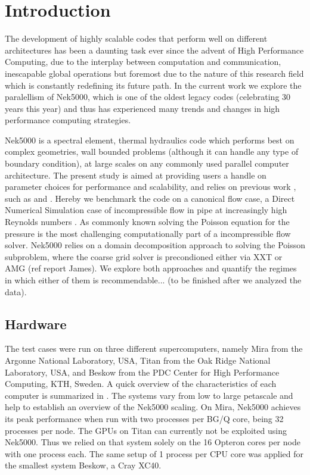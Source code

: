 \documentclass{sig-alternate}
\begin{document}
%
%

%
%
\printccsdesc



\section{Introduction}
The development of highly scalable codes that perform well on different architectures has been a daunting task ever since the advent of High Performance Computing, due to the interplay between computation and communication, inescapable global operations but foremost due to the nature of this research field which is constantly redefining its future path. In the current work we explore the paralellism of Nek5000, which is one of the oldest legacy codes (celebrating 30 years this year) and thus has experienced many trends and changes in high performance computing strategies.

Nek5000 is a spectral element, thermal hydraulics code which performs best on complex geometries, wall bounded problems (although it can handle any type of boundary condition), at large scales on any commonly used parallel computer architecture. The present study is aimed at providing users a handle on parameter choices for performance and scalability, and relies on previous work , such as \cite{fischer:scaling} and \cite{tufo:terascale}. Hereby we benchmark the code on a canonical flow case, a Direct Numerical Simulation case of incompressible flow in pipe at increasingly high Reynolds numbers \cite{Khoury2013}. As commonly known solving the Poisson equation for the pressure is the most challenging computationally part of a incompressible flow solver. Nek5000 relies on a domain decomposition approach to solving the Poisson subproblem, where the coarse grid solver is precondioned either via XXT \cite{Tufo2001151} or AMG (ref report James). We explore both approaches and quantify the regimes in which either of them is recommendable... (to be finished after we analyzed the data).

\subsection{Hardware}

The test cases were run on three different supercomputers, namely Mira from the
Argonne National Laboratory, USA, Titan from the Oak Ridge National Laboratory,
USA, and Beskow from the PDC Center for High Performance Computing, KTH, Sweden.
A quick overview of the characteristics of each computer is summarized in 
. The systems vary from low to large petascale and help to
establish an overview of the Nek5000 scaling. On Mira, Nek5000 achieves its
peak performance when run with two processes per BG/Q core, being 32 processes
per node. The GPUs on Titan can
currently not be exploited using Nek5000. Thus we relied on that system solely
on the 16 Opteron cores per node with one process each. The same setup of 1
process per CPU core was applied for the smallest system Beskow, a Cray XC40.
\end{document}
